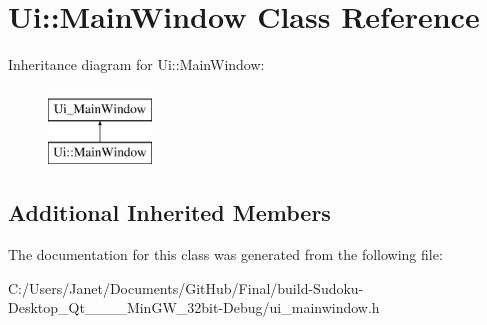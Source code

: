 \hypertarget{class_ui_1_1_main_window}{\section{Ui\-:\-:Main\-Window Class Reference}
\label{class_ui_1_1_main_window}
}
Inheritance diagram for Ui\-:\-:Main\-Window\-:\begin{figure}[H]
\begin{center}
\leavevmode
\includegraphics[height=2.000000cm]{class_ui_1_1_main_window}
\end{center}
\end{figure}
\subsection*{Additional Inherited Members}


The documentation for this class was generated from the following file\-:\begin{DoxyCompactItemize}
\item 
C\-:/\-Users/\-Janet/\-Documents/\-Git\-Hub/\-Final/build-\/\-Sudoku-\/\-Desktop\-\_\-\-Qt\-\_\-\_\-\_\-\_\-\-Min\-G\-W\-\_\-32bit-\/\-Debug/ui\-\_\-mainwindow.\-h\end{DoxyCompactItemize}
